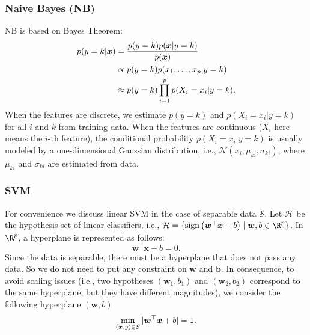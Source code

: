 {    \subsubsection{Naive Bayes (NB)}
        NB is based on Bayes Theorem: 
            \begin{equation}
                \begin{aligned}
                    p(y=k | \bm{x}) & = \frac{p(y=k) p(\bm{x} | y=k)}{p(\bm{x})} \\
                    & \propto p(y=k) p(x_1, \ldots, x_{p} | y=k) \\
                    & \approx p(y=k) \prod_{i=1}^{p}{p(X_i = x_i | y=k)}.
                \end{aligned}
            \end{equation}
        When the features are discrete, we estimate $p(y=k)$ and $p(X_i = x_i | y=k)$ for all $i$ and $k$ from training data.
        When the features are continuous ($X_i$ here means the $i$-th feature), the conditional probability $p(X_i = x_i | y=k)$  is usually modeled by a one-dimensional Gaussian distribution, i.e., $\mathcal{N}(x_i; \mu_{ki}, \sigma_{ki})$, where $\mu_{ki}$ and $\sigma_{ki}$ are estimated from data.
        
    \subsubsection{SVM}
        For convenience we discuss linear SVM in the case of separable data $\mathcal{S}$.
        Let $\mathcal{H}$ be the hypothesis set of linear classifiers, i.e., $\mathcal{H}=\Set{\Sign{\bm{w}^\top \bm{x} + b}}{\bm{w}, b \in \R^\nfeat}$.
        In $\R^\nfeat$, a hyperplane is represented as follows:
            \begin{equation}
                \bm{w}^\top \bm{x} + b = 0.
            \end{equation}
        Since the data is separable, there must be a hyperplane that does not pass any data.
        So we do not need to put any constraint on $\bm{w}$ and $\bm{b}$.
        In consequence, to avoid scaling issues (i.e., two hypotheses $(\bm{w}_1, b_1)$ and $(\bm{w}_2, b_2)$ correspond to the same hyperplane, but they have different magnitudes), we consider the following hyperplane $(\bm{w}, b)$:
            \begin{equation}
                \min_{(\bm{x}, y) \in \mathcal{S}} | \bm{w}^\top \bm{x} + b | = 1.
            \end{equation}
        
}
